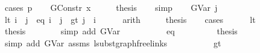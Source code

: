 \begin{isabellebody}
%
\isadelimproof
%
\endisadelimproof
%
\isatagproof
{}\isamarkupfalse%
\ {\isacharparenleft}{\kern0pt}cases\ p{\isacharparenright}{\kern0pt}\isanewline
\ \ \isamarkupfalse%
\ {\isacharparenleft}{\kern0pt}GConstr\ x{}{\isacharparenright}{\kern0pt}\isanewline
\ \ \isamarkupfalse%
\ \isamarkupfalse%
\ {\isacharquery}{\kern0pt}thesis\isanewline
\ \ \isamarkupfalse%
\ simp\isanewline
{}\isamarkupfalse%
\isanewline
\ \ \isamarkupfalse%
\ {\isacharparenleft}{\kern0pt}GVar\ j{\isacharparenright}{\kern0pt}\isanewline
\ \ \isamarkupfalse%
\ {\isacharparenleft}{\kern0pt}lt{\isacharparenright}{\kern0pt}\ {\isachardoublequoteopen}i\ {\isacharless}{\kern0pt}\ j{\isachardoublequoteclose}\ {\isacharbar}{\kern0pt}\ {\isacharparenleft}{\kern0pt}eq{\isacharparenright}{\kern0pt}\ {\isachardoublequoteopen}i\ {\isacharequal}{\kern0pt}\ j{\isachardoublequoteclose}\ {\isacharbar}{\kern0pt}\ {\isacharparenleft}{\kern0pt}gt{\isacharparenright}{\kern0pt}\ {\isachardoublequoteopen}j\ {\isacharless}{\kern0pt}\ i{\isachardoublequoteclose}\isanewline
\ \ \ \ \isamarkupfalse%
\ arith\isanewline
\ \ \isamarkupfalse%
\ \isamarkupfalse%
\ {\isacharquery}{\kern0pt}thesis\isanewline
\ \ \isamarkupfalse%
\ cases\isanewline
\ \ \ \ \isamarkupfalse%
\ lt\isanewline
\ \ \ \ \ \ \isamarkupfalse%
\ \isamarkupfalse%
\ {\isacharquery}{\kern0pt}thesis\isanewline
\ \ \ \ \ \ \isamarkupfalse%
\ {\isacharparenleft}{\kern0pt}simp\ add{\isacharcolon}{\kern0pt}\ GVar{\isacharparenright}{\kern0pt}\isanewline
\ \ \ \ \isamarkupfalse%
\isanewline
\ \ \ \ \isamarkupfalse%
\ eq\isanewline
\ \ \ \ \ \ \isamarkupfalse%
\ \isamarkupfalse%
\ {\isacharquery}{\kern0pt}thesis\isanewline
\ \ \ \ \ \ \isamarkupfalse%
\ {\isacharparenleft}{\kern0pt}simp\ add{\isacharcolon}{\kern0pt}\ GVar\ assms{\isacharparenleft}{\kern0pt}{}{\isacharcomma}{\kern0pt}{}{\isacharparenright}{\kern0pt}\ lsubst{\isacharunderscore}{\kern0pt}graph{\isacharunderscore}{\kern0pt}freelinks{\isacharparenright}{\kern0pt}\isanewline
\ \ \ \ \isamarkupfalse%
\isanewline
\ \ \ \ \isamarkupfalse%
\ gt\isanewline
\ \ \ \ \ \ \isamarkupfalse%

\end{isabellebody}
